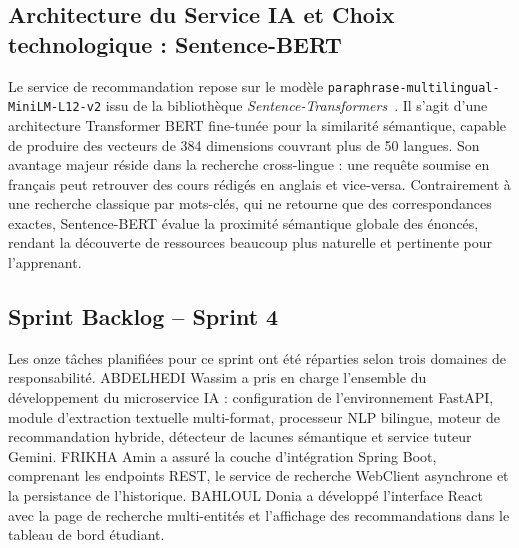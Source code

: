 \documentclass[12pt,a4paper]{report}
\begin{document}
\subsection{Architecture du Service IA et Choix technologique : Sentence-BERT}

Le service de recommandation repose sur le modèle \texttt{paraphrase-multilingual-MiniLM-L12-v2} issu de la bibliothèque \textit{Sentence-Transformers}~\cite{sbert}. Il s'agit d'une architecture Transformer BERT fine-tunée pour la similarité sémantique, capable de produire des vecteurs de 384 dimensions couvrant plus de 50 langues. Son avantage majeur réside dans la recherche cross-lingue : une requête soumise en français peut retrouver des cours rédigés en anglais et vice-versa. Contrairement à une recherche classique par mots-clés, qui ne retourne que des correspondances exactes, Sentence-BERT évalue la proximité sémantique globale des énoncés, rendant la découverte de ressources beaucoup plus naturelle et pertinente pour l'apprenant.

\subsection{Sprint Backlog -- Sprint 4}

Les onze tâches planifiées pour ce sprint ont été réparties selon trois domaines de responsabilité. ABDELHEDI Wassim a pris en charge l'ensemble du développement du microservice IA : configuration de l'environnement FastAPI, module d'extraction textuelle multi-format, processeur NLP bilingue, moteur de recommandation hybride, détecteur de lacunes sémantique et service tuteur Gemini. FRIKHA Amin a assuré la couche d'intégration Spring Boot, comprenant les endpoints REST, le service de recherche WebClient asynchrone et la persistance de l'historique. BAHLOUL Donia a développé l'interface React avec la page de recherche multi-entités et l'affichage des recommandations dans le tableau de bord étudiant.
\end{document}

